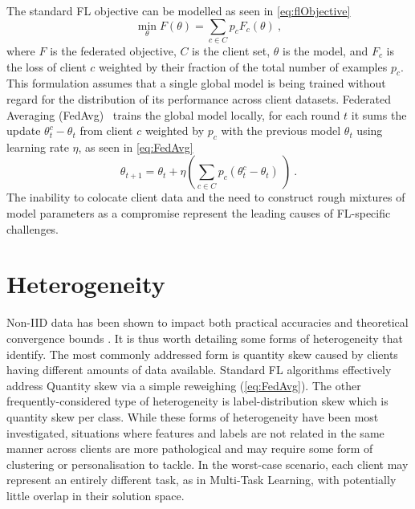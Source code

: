 
The standard FL objective can be modelled as seen in \cref{eq:flObjective}
\begin{equation} \label{eq:flObjective}
    \underset{\theta}{\min} F(\theta) = \sum_{c \in C} p_c F_c(\theta) \ ,
\end{equation}
where \(F\) is the federated objective, $C$ is the client set, $\theta$ is the model, and \(F_c\) is the loss of client \(c\) weighted by their fraction of the total number of examples $p_c$. This formulation assumes that a single global model is being trained without regard for the distribution of its performance across client datasets. Federated Averaging (FedAvg)~\citep{FedAvg} trains the global model locally, for each round $t$ it sums the update \(\theta_t^c - \theta_t\) from client $c$ weighted by \(p_c\) with the previous model \(\theta_t\) using learning rate \( \eta \), as seen in \cref{eq:FedAvg}
\begin{equation} \label{eq:FedAvg}
    \theta_{t+1} = \theta_t + \eta \left( \sum_{c \in C} p_c \left(\theta_t^c - \theta_t \right) \ \right) \ .
\end{equation}
The inability to colocate client data and the need to construct rough mixtures of model parameters as a compromise represent the leading causes of FL-specific challenges.

\section{Heterogeneity}\label{background:data_heterogeneity}

Non-IID data has been shown to impact both practical accuracies \citep{FLwithNonIID, NonIIDQagmire} and theoretical convergence bounds \citep{OnTheConvergenceOfFedAvgOnNonIIDdata}. It is thus worth detailing some forms of heterogeneity that \citet{AdvancedAndOpenProblems} identify. The most commonly addressed form is quantity skew caused by clients having different amounts of data available. Standard FL algorithms effectively address Quantity skew via a simple reweighing (\cref{eq:FedAvg}). The other frequently-considered type of heterogeneity is label-distribution skew which is quantity skew per class. While these forms of heterogeneity have been most investigated, situations where features and labels are not related in the same manner across clients are more pathological and may require some form of clustering or personalisation to tackle. In the worst-case scenario, each client may represent an entirely different task, as in Multi-Task Learning, with potentially little overlap in their solution space.


